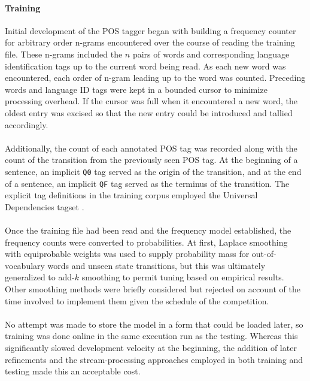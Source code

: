 \documentclass[11pt,a4paper]{article}
\begin{document}
\paragraph{Training}
Initial development of the POS tagger began with building a frequency counter for
arbitrary order n-grams encountered over the course of reading the training file.
These n-grams included the $n$ pairs of words and corresponding language identification
tags up to the current word being read. As each new word was encountered, each
order of n-gram leading up to the word was counted. Preceding words and language ID
tags were kept in a bounded cursor to minimize processing overhead. If the cursor
was full when it encountered a new word, the oldest entry was excised so that the
new entry could be introduced and tallied accordingly.

\paragraph{}
Additionally, the count of each annotated POS tag was recorded along with the count
of the transition from the previously seen POS tag. At the beginning of a sentence,
an implicit \texttt{Q0} tag served as the origin of the transition, and at the end
of a sentence, an implicit \texttt{QF} tag served as the terminus of the transition.
The explicit tag definitions in the training corpus employed the Universal Dependencies
tagset \cite{UPOS}.

\paragraph{}
Once the training file had been read and the frequency model established,
the frequency counts were converted to probabilities. At first, Laplace smoothing
\cite[47]{JurafskyMartin}
with equiprobable weights was used to supply probability mass for out-of-vocabulary
words and unseen state transitions, but this was ultimately generalized to add-$k$
smoothing \cite[49]{JurafskyMartin} to permit tuning based on empirical results.
Other smoothing methods were briefly considered but rejected on account of the time
involved to implement them given the schedule of the competition.

\paragraph{}
No attempt was made to store the model in a form that could be loaded later,
so training was done online in the same execution run as the testing.
Whereas this significantly slowed development velocity at the beginning,
the addition of later refinements and the stream-processing approaches
employed in both training and testing made this an acceptable cost.
\end{document}
